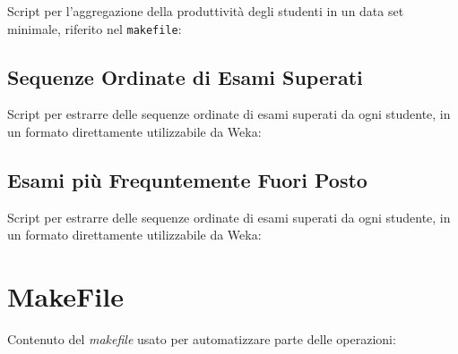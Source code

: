 \begin{appendices}
            Script per l'aggregazione della produttività degli studenti in un data set minimale, riferito nel \texttt{makefile}:
            

        \subsection{Sequenze Ordinate di Esami Superati}
        \label{appendix:seq}

            Script per estrarre delle sequenze ordinate di esami superati da ogni studente, in un formato direttamente utilizzabile da Weka:
            

        \subsection{Esami più Frequntemente Fuori Posto}
        \label{appendix:freq}

            Script per estrarre delle sequenze ordinate di esami superati da ogni studente, in un formato direttamente utilizzabile da Weka:
            

    \section{MakeFile}
    \label{appendix:makefile}

        Contenuto del \textit{makefile} usato per automatizzare parte delle operazioni:


\end{appendices}

